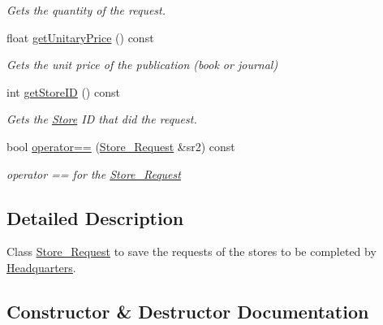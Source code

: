 \begin{DoxyCompactItemize}
\begin{DoxyCompactList}\small\item\em Gets the quantity of the request. \end{DoxyCompactList}\item 
float \hyperlink{class_store___request_a93fc46718e228136422fd03dd36032aa}{get\+Unitary\+Price} () const
\begin{DoxyCompactList}\small\item\em Gets the unit price of the publication (book or journal) \end{DoxyCompactList}\item 
int \hyperlink{class_store___request_a5fb72da2677412686a919e705714a85d}{get\+Store\+ID} () const
\begin{DoxyCompactList}\small\item\em Gets the \hyperlink{class_store}{Store} ID that did the request. \end{DoxyCompactList}\item 
bool \hyperlink{class_store___request_acaf1134a64475cff2641234e32b0b263}{operator==} (\hyperlink{class_store___request}{Store\+\_\+\+Request} \&sr2) const
\begin{DoxyCompactList}\small\item\em operator == for the \hyperlink{class_store___request}{Store\+\_\+\+Request} \end{DoxyCompactList}\end{DoxyCompactItemize}


\subsection{Detailed Description}
Class \hyperlink{class_store___request}{Store\+\_\+\+Request} to save the requests of the stores to be completed by \hyperlink{class_headquarters}{Headquarters}. 

\subsection{Constructor \& Destructor Documentation}
\mbox{\label{class_store___request_a38aa663a0d31c17aad7629e61509df21}} 
